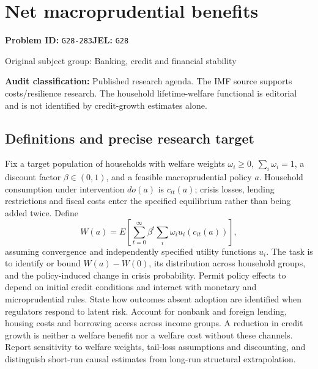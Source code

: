 \documentclass[11pt,a4paper]{article}
\begin{document}
\section*{Net macroprudential benefits}
\textbf{Problem ID:} \texttt{G28-283}\quad \textbf{JEL:} \texttt{G28}\par
\label{problem:OP-0324}
{\sffamily\small\color{muted}Original subject group: Banking, credit and financial stability\par}
\label{definitions:problem:30007606}
\textbf{Audit classification:} Published research agenda. The IMF source supports costs/resilience research. The household lifetime-welfare functional is editorial and is not identified by credit-growth estimates alone.
\subsection*{Definitions and precise research target}
Fix a target population of households with welfare weights \(\omega_i\geq0\), \(\sum_i\omega_i=1\), a discount factor \(\beta\in(0,1)\), and a feasible macroprudential policy \(a\). Household consumption under intervention \(do(a)\) is \(c_{it}(a)\); crisis losses, lending restrictions and fiscal costs enter the specified equilibrium rather than being added twice. Define
\[W(a)=E\left[\sum_{t=0}^{\infty}\beta^t\sum_i\omega_i u_i(c_{it}(a))\right],\]
assuming convergence and independently specified utility functions \(u_i\). The task is to identify or bound \(W(a)-W(0)\), its distribution across household groups, and the policy-induced change in crisis probability. Permit policy effects to depend on initial credit conditions and interact with monetary and microprudential rules. State how outcomes absent adoption are identified when regulators respond to latent risk. Account for nonbank and foreign lending, housing costs and borrowing access across income groups. A reduction in credit growth is neither a welfare benefit nor a welfare cost without these channels. Report sensitivity to welfare weights, tail-loss assumptions and discounting, and distinguish short-run causal estimates from long-run structural extrapolation.
\end{document}
